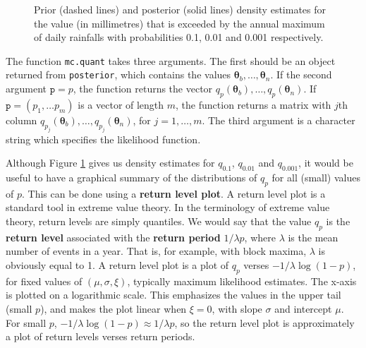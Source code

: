 \documentclass[11pt,a4paper]{article}
\newcommand{\bs}{\boldsymbol}
\begin{document}
\begin{figure}
\begin{center}
   \vspace{-1.5cm}
  \hspace{0cm} 
  \hspace{0cm} 
\end{center}
\caption{Prior (dashed lines) and posterior (solid lines) density
  estimates for the value (in millimetres) that is exceeded by the
  annual maximum of daily rainfalls with probabilities 0.1, 0.01 and
  0.001 respectively.}
\label{pqrain}
\end{figure}

The function \verb+mc.quant+ takes three arguments.  The first should be
an object returned from \verb+posterior+, which contains the values
$\bs{\theta}_b, \dots, \bs{\theta}_n$.  If the second argument
$\texttt{p} = p$, the function returns the vector $q_p(\bs{\theta}_b),
\dots, q_p(\bs{\theta}_n)$.  If $\texttt{p} = (p_1, \dots p_m)$ is a
vector of length $m$, the function returns a matrix with $j$th column
$q_{p_j}(\bs{\theta}_b), \dots, q_{p_j}(\bs{\theta}_n)$, for
$j=1,\dots,m$. The third argument is a character string which
specifies the likelihood function.

Although Figure \ref{pqrain} gives us density estimates for $q_{0.1}$,
$q_{0.01}$ and $q_{0.001}$, it would be useful to have a graphical
summary of the distributions of $q_p$ for all (small) values of $p$.
This can be done using a \textbf{return level plot}.  A return level
plot is a standard tool in extreme value theory.  In the terminology
of extreme value theory, return levels are simply quantiles.  We would
say that the value $q_p$ is the \textbf{return level} associated with
the \textbf{return period} $1/\lambda p$, where $\lambda$ is the mean
number of events in a year. That is, for example, with block maxima,
$\lambda$ is obviously equal to 1. A return level plot is a plot of
$q_p$ verses $-1/\lambda\log(1-p)$, for fixed values of
$(\mu,\sigma,\xi)$, typically maximum likelihood estimates.  The
x-axis is plotted on a logarithmic scale.  This emphasizes the values
in the upper tail (small $p$), and makes the plot linear when $\xi=0$,
with slope $\sigma$ and intercept $\mu$.  For small $p$,
$-1/\lambda\log(1-p) \approx 1/\lambda p$, so the return level plot is
approximately a plot of return levels verses return periods.
\end{document}
